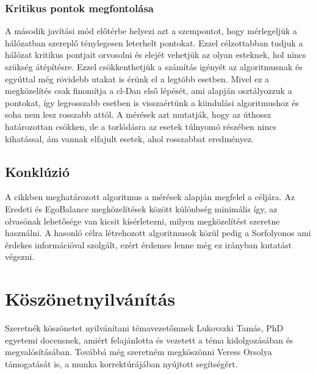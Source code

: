 \documentclass[12pt]{report}
\begin{document}
\pagebreak

\subsection{Kritikus pontok megfontolása}

A második javítási mód előtérbe helyezi azt a szempontot, hogy mérlegeljük a hálózatban szereplő ténylegesen leterhelt pontokat.
Ezzel célzottabban tudjuk a hálózat kritikus pontjait orvosolni és elejét vehetjük az olyan esteknek, hol nincs szükség átépítésre.
Ezzel csökkenthetjük a számítás igényét az algoritmusnak és egyúttal még rövidebb utakat is érünk el a legtöbb esetben.
Mivel ez a megközelítés csak finomítja a cl-Dan első lépését, ami alapján osztályozzuk a pontokat, így legrosszabb esetben is visszaértünk a kiindulási algoritmushoz és soha nem lesz rosszabb attól.
A mérések azt mutatják, hogy az úthossz határozottan csökken, de a torlódásra az esetek túlnyomó részében nincs kihatással, ám vannak elfajult esetek, ahol rosszabbat eredményez.

\section{Konklúzió}

A cikkben \cite{avin_demand-aware_nodate} meghatározott algoritmus a mérések alapján megfelel a céljára.
Az Eredeti és EgoBalance megközelítések között különbség minimális így, az olvasónak lehetősége van kicsit kísérletezni, milyen megközelítést szeretne használni.
A hasonló célra létrehozott algoritmusok közül pedig a Sorfolyonos ami érdekes információval szolgált, ezért érdemes lenne még ez irányban kutatást végezni.


\chapter{Köszönetnyilvánítás}

Szeretnék köszönetet nyilvánítani témavezetőmnek Lukovszki Tamás, PhD egyetemi docensnek, amiért felajánlotta és vezetett a téma kidolgozásában és megvalósításában.
Továbbá még szeretném megköszönni Veress Orsolya támogatását is, a munka korrektúrájában nyújtott segítségért.  





	
\end{document}
